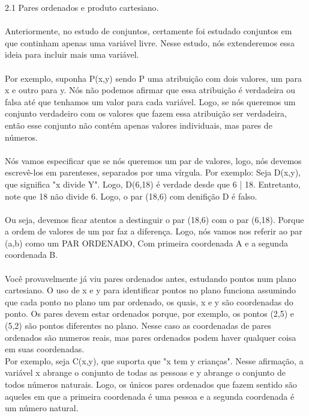 
{\large 2.1 Pares ordenados e produto cartesiano.}
\\
\\


Anteriormente, no estudo de conjuntos, certamente foi estudado conjuntos em que continham apenas uma variável livre.
Nesse estudo, nós extenderemos essa ideia para incluir mais uma variável.
\\
\\
Por exemplo, suponha P(x,y) sendo P uma atribuição com dois valores, um para x e outro para y. Nós não podemos afirmar que essa
atribuição é verdadeira ou falsa até que tenhamos um valor para cada variável.
Logo, se nós queremos um conjunto verdadeiro com os valores que fazem essa atribuição ser verdadeira, então esse conjunto não 
contém apenas valores individuais, mas pares de números.
\\
\\
Nós vamos especificar que se nós queremos um par de valores, logo, nós devemos escrevê-los em parenteses, separados por uma 
vírgula. Por exemplo: Seja D(x,y), que significa "x divide Y". Logo, D(6,18) é verdade desde que 6 | 18. 
Entretanto, note que 18 não divide 6. Logo, o par (18,6) com denifição D é falso.
\\
\\
Ou seja, devemos ficar atentos a destinguir o par (18,6) com o par (6,18). Porque a ordem de valores de um par faz a diferença.
Logo, nós vamos nos referir ao par (a,b) como um PAR ORDENADO, Com primeira coordenada A e a segunda coordenada B.
\\
\\
Você provavelmente já viu pares ordenados antes, estudando pontos num plano cartesiano. O uso de x e y para identificar pontos 
no plano funciona assumindo que cada ponto no plano um par ordenado, os quais, x e y são coordenadas do ponto. Os pares devem 
estar ordenados porque, por exemplo, os pontos (2,5) e (5,2) são pontos diferentes no plano. Nesse caso as coordenadas de pares
ordenados são numeros reais, mas pares ordenados podem haver qualquer coisa em suas coordenadas.
\\
Por exemplo, seja C(x,y), que suporta que "x tem y crianças". Nesse afirmação, a variável x abrange o conjunto de todas as 
pessoas e y abrange o conjunto de todos números naturais. Logo, os únicos pares ordenados que fazem sentido são aqueles em
que a primeira coordenada é uma pessoa e a segunda coordenada é um número natural.